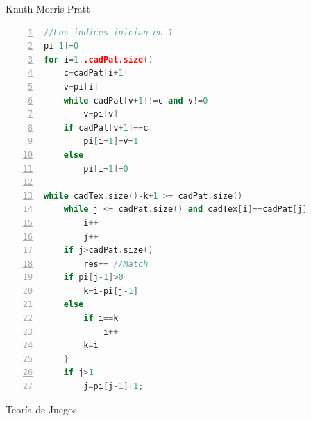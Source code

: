 \documentclass[a4paper,spanish,10pt]{article}
\begin{document}
Knuth-Morris-Pratt

\begin{lstlisting}[language=C++, numbers=left, tabsize=4]
//Los indices inician en 1
pi[1]=0
for i=1..cadPat.size()
    c=cadPat[i+1]
    v=pi[i]
    while cadPat[v+1]!=c and v!=0
        v=pi[v]
    if cadPat[v+1]==c
        pi[i+1]=v+1
    else
        pi[i+1]=0

while cadTex.size()-k+1 >= cadPat.size()
    while j <= cadPat.size() and cadTex[i]==cadPat[j]
        i++
        j++
    if j>cadPat.size()
        res++ //Match
    if pi[j-1]>0
        k=i-pi[j-1]
    else
        if i==k
            i++
        k=i
    }
    if j>1
        j=pi[j-1]+1;
\end{lstlisting}

\newpage
Teor\'ia de Juegos\\
\end{document}
